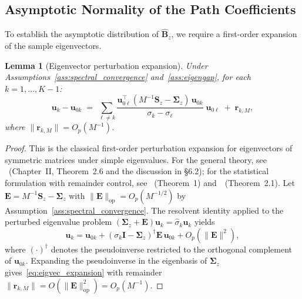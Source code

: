 \documentclass{article}
\newtheorem{lemma}[theorem]{Lemma}
\begin{document}
\subsection{Asymptotic Normality of the Path Coefficients}
\label{subsec:asymptotic_normality}

To establish the asymptotic distribution of $\hat{\mathbf{B}}_z$, we
require a first-order expansion of the sample eigenvectors.

\begin{lemma}[Eigenvector perturbation expansion]
\label{lem:eigvec_expansion}
Under Assumptions~\ref{ass:spectral_convergence}
and~\ref{ass:eigengap}, for each $k=1,\dots,K{-}1$:
\begin{equation}
  \mathbf{u}_k - \mathbf{u}_{0k}
  \;=\;
  \sum_{\ell\neq k}
  \frac{\mathbf{u}_{0\ell}^{\!\top}
        (M^{-1}\mathbf{S}_z - \boldsymbol{\Sigma}_z)\,
        \mathbf{u}_{0k}}
       {\sigma_k - \sigma_\ell}\;
  \mathbf{u}_{0\ell}
  \;+\;
  \mathbf{r}_{k,M},
  \label{eq:eigvec_expansion}
\end{equation}
where $\|\mathbf{r}_{k,M}\| = O_p(M^{-1})$.
\end{lemma}

\begin{proof}
This is the classical first-order perturbation expansion for
eigenvectors of symmetric matrices under simple eigenvalues. For the
general theory, see \citet{kato1995perturbation}~(Chapter~II,
Theorem~2.6 and the discussion in \S6.2);
for the statistical formulation with remainder control, see
\citet{anderson1963asymptotic}~(Theorem~1)
and~\citet{tyler1981asymptotic}~(Theorem~2.1).
Let $\mathbf{E} = M^{-1}\mathbf{S}_z - \boldsymbol{\Sigma}_z$ with
$\|\mathbf{E}\|_{\mathrm{op}} = O_p(M^{-1/2})$ by
Assumption~\ref{ass:spectral_convergence}.
The resolvent identity applied to the perturbed eigenvalue problem
$(\boldsymbol{\Sigma}_z + \mathbf{E})\mathbf{u}_k
= \hat\sigma_k\mathbf{u}_k$ yields
\[
  \mathbf{u}_k
  = \mathbf{u}_{0k}
    + (\sigma_k\mathbf{I} - \boldsymbol{\Sigma}_z)^{\dagger}
      \mathbf{E}\,\mathbf{u}_{0k}
    + O_p(\|\mathbf{E}\|^2),
\]
where $(\cdot)^{\dagger}$ denotes the pseudoinverse restricted to the
orthogonal complement of $\mathbf{u}_{0k}$.
Expanding the pseudoinverse in the eigenbasis of $\boldsymbol{\Sigma}_z$
gives~\eqref{eq:eigvec_expansion} with remainder
$\|\mathbf{r}_{k,M}\| = O(\|\mathbf{E}\|^2_{\mathrm{op}})
= O_p(M^{-1})$.
\end{proof}
\end{document}
